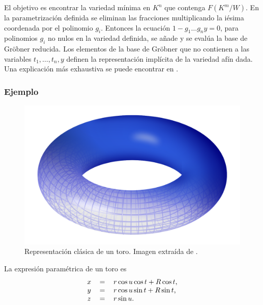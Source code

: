 El objetivo es encontrar la variedad mínima en $K^n$ que contenga $F(K^m / W)$. En la parametrización definida se eliminan las fracciones multiplicando la iésima coordenada por el polinomio $g_i$. Entonces la ecuación $1 - g_1 \dotso g_n y = 0$, para polinomios $g_i$ no nulos en la variedad definida, se añade  y se evalúa la base de Gröbner reducida. Los elementos de la base de Gröbner que no contienen a las variables $t_1, \dotso, t_n, y$ definen la representación implícita de la variedad afín dada. Una explicación más exhaustiva se puede encontrar en \cite{Hoffmann93}.

\subsubsection*{Ejemplo}

\begin{figure}[h]
\centering
\includegraphics[width=0.5\linewidth]{images/Torus.png}
\caption{Representación clásica de un toro. Imagen extraída de \cite{Wikipedia:Torus}.}
\end{figure}

La expresión paramétrica de un toro es
\begin{equation}
\begin{tabular}{c c l}
$x$ & $=$ & $r \cos u \cos t + R \cos t$, \\
$y$ & $=$ & $r \cos u \sin t + R \sin t$, \\
$z$ & $=$ & $r \sin u$.
\end{tabular}
\nonumber
\end{equation}

